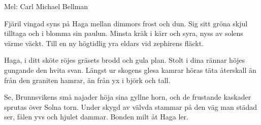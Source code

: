 \begin{SongText}
    \begin{SongInfo}
        Mel: Carl Michael Bellman
    \end{SongInfo}
    \begin{SongVerse}
        Fjäril vingad syns på Haga
        mellan dimmors frost och dun.
        Sig sitt gröna skjul tilltaga
        och i blomma sin paulun.
        Minsta kräk i kärr och syra,
        nyss av solens värme väckt.
        Till en ny högtidlig yra
        eldars vid zephirens fläckt.
    \end{SongVerse}
    \begin{SongVerse}
        Haga, i ditt sköte röjes
        gräsets brodd och gula plan.
        Stolt i dina rännar höjes
        gungande den hvita svan.
        Längst ur skogens glesa kamrar
        höras täta återskall
        än från den graniten hamrar,
        än från yx i björk och tall.
    \end{SongVerse}
    \begin{SongVerse}
        Se, Brunnsvikens små najader
        höja sina gyllne horn,
        och de frustande kaskader
        sprutas över Solna torn.
        Under skygd av välvda stammar
        på den väg man städad ser,
        fålen yvs och hjulet dammar.
        Bonden milt åt Haga ler. 
    \end{SongVerse}
\end{SongText}